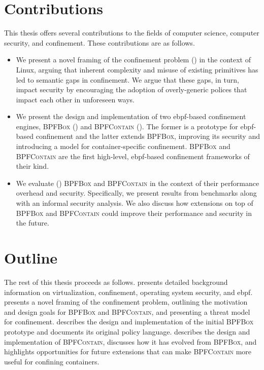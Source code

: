 \documentclass[
  fontsize=12pt,
  titlepage=firstiscover,
  paper=letter,
oneside,
  cleardoublepage=plain,
  parskip=half-,
  DIV=10,
  parindent,
  appendixprefix,
  chapterprefix,
  listof=totoc,
]{scrbook}
\newcommand{\bpfbox}{\textsc{BPFBox}}
\newcommand{\bpfcontain}{\textsc{BPFContain}}
\begin{document}
\section{Contributions}\label{s:contributions}

This thesis offers several contributions to the fields of computer science, computer security, and
confinement. These contributions are as follows.
\begin{itemize}
  \item We present a novel framing of the confinement problem
  () in the context of Linux, arguing that inherent complexity
  and misuse of existing primitives has led to semantic gaps in confinement. We argue that
  these gaps, in turn, impact security by encouraging the adoption of overly-generic
  polices that impact each other in unforeseen ways.

  \item We present the design and implementation of two \gls{ebpf}-based confinement
  engines, \bpfbox{} () and \bpfcontain{} (). The former
  is a prototype for \gls{ebpf}-based confinement and the latter extends \bpfbox{},
  improving its security and introducing a model for container-specific confinement.
  \bpfbox{} and \bpfcontain{} are the first high-level, \gls{ebpf}-based confinement
  frameworks of their kind.

  \item We evaluate () \bpfbox{} and \bpfcontain{} in the context of
  their performance overhead and security. Specifically, we present results from
  benchmarks along with an informal security analysis. We also discuss how extensions on
  top of \bpfbox{} and \bpfcontain{} could improve their performance and security in the
  future.



\end{itemize}

\section{Outline}\label{s:outline}

The rest of this thesis proceeds as follows.  presents detailed
background information on virtualization, confinement, operating system security, and
\gls{ebpf}.   presents a novel framing of the confinement
problem, outlining the motivation and design goals for \bpfbox{} and \bpfcontain{}, and
presenting a threat model for confinement.   describes the design and
implementation of the initial \bpfbox{} prototype and documents its original policy
language.  describes the design and implementation of \bpfcontain{},
discusses how it has evolved from \bpfbox{}, and highlights opportunities for future
extensions that can make \bpfcontain{} more useful for confining containers.
\end{document}
